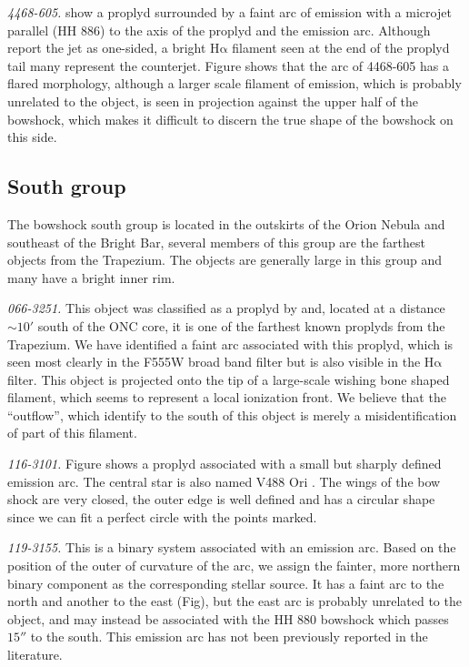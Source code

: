 \documentclass[iop, apj]{emulateapj}
\newcommand\ha{\ensuremath{\mathrm{H\alpha}}}
\renewcommand\clearpage{}
\begin{document}
\textit{4468-605.}  \citet{Bally:2006a} show a proplyd  surrounded by a faint arc of emission with a  microjet parallel (HH 886) to the axis of the proplyd and the emission arc. Although \citet{Bally:2006a} report the jet as one-sided, a bright \ha{} filament seen at the end of the proplyd tail many represent the counterjet.  Figure shows that the arc of 4468-605 has a flared morphology, although a larger scale filament of emission, which is probably unrelated to the object, is seen in projection against the upper half of the bowshock, which makes it difficult to discern the true shape of the bowshock on this side. 

\clearpage
\subsection{South group}
\label{sec:s-group}



The bowshock south group is located in the outskirts of the Orion Nebula and southeast of the Bright Bar, several members of this group are the farthest objects from the Trapezium. The objects are generally large in this group and many have a bright inner rim.   

\textit{066-3251.} This object was classified as a proplyd by \citet{Ricci:2008a} and, located at a distance \(\sim 10'\) south of the ONC core, it is one of the farthest known proplyds from the Trapezium. We have identified a faint arc associated with this proplyd, which is seen most clearly in the F555W broad band filter but is also visible in the \ha{} filter. This object is projected onto the tip of a large-scale wishing bone shaped filament, which seems to represent a local ionization front. We believe that the ``outflow'', which \citet{Ricci:2008a} identify to the south of this object is merely a misidentification of part of this filament.  

\textit{116-3101.} Figure shows a proplyd associated with a small but sharply defined emission arc.  The central star is also named V488 Ori \citep{Bally:2006a}. The wings of the bow shock are very closed, the outer edge is well defined and has a circular shape since we can fit a perfect circle with the points marked.  

\textit{119-3155.} This is a binary system  associated with an emission arc. Based on the position of the outer of curvature of the arc, we assign the fainter, more northern binary component as the corresponding stellar source. It has a faint arc to the north and another to the east (Fig), but  the east arc is probably unrelated to the object, and may instead be associated with the HH 880 bowshock which passes \(15''\) to the south. This emission arc has not been previously reported in the literature.     
\end{document}
